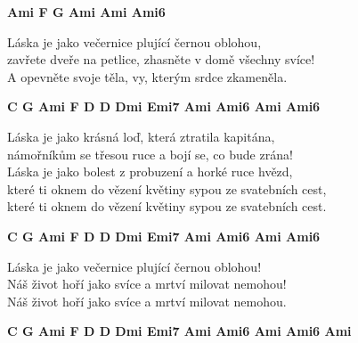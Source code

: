 
\re{}
{\footnotesize \textbf{Ami \quad F \quad G \quad Ami \quad Ami \quad Ami6}}

\ve
{}Láska je jako večernice plující černou oblohou,\\
zavřete dveře na petlice, zhasněte v domě všechny svíce!\\
A opevněte svoje těla, vy, kterým srdce zkameněla.

\re{}
{\footnotesize \textbf{C \quad G \quad Ami \quad F \quad D \quad D \quad Dmi \quad Emi7 \quad Ami \quad Ami6 \quad Ami \quad Ami6}}

\ve
{}Láska je jako krásná loď, která ztratila kapitána,\\
námořníkům se třesou ruce a bojí se, co bude zrána!\\
Láska je jako bolest z probuzení a horké ruce hvězd,\\
které ti oknem do vězení květiny sypou ze svatebních cest,\\
které ti oknem do vězení květiny sypou ze svatebních cest.

\re{}
{\footnotesize \textbf{C \quad G \quad Ami \quad F \quad D \quad D \quad Dmi \quad Emi7 \quad Ami \quad Ami6 \quad Ami \quad Ami6}}

\ve
{}Láska je jako večernice plující černou oblohou!\\
Náš život hoří jako svíce a mrtví milovat nemohou!\\
Náš život hoří jako svíce a mrtví milovat nemohou.

\re{}
{\footnotesize \textbf{C \quad G \quad Ami \quad F \quad D \quad D \quad Dmi \quad Emi7 \quad Ami \quad Ami6 \quad Ami \quad Ami6 \quad Ami}}

\esong{}